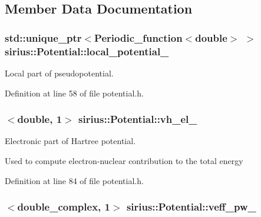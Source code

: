 \subsection{Member Data Documentation}
\hypertarget{classsirius_1_1_potential_a4071c9c5b14fd52005538e4de6e7943d}{}
\subsubsection[{local\+\_\+potential\+\_\+}]{\setlength{\rightskip}{0pt plus 5cm}std\+::unique\+\_\+ptr$<${\bf Periodic\+\_\+function}$<$double$>$ $>$ sirius\+::\+Potential\+::local\+\_\+potential\+\_\+\hspace{0.3cm}{\ttfamily [private]}}\label{classsirius_1_1_potential_a4071c9c5b14fd52005538e4de6e7943d}


Local part of pseudopotential. 



Definition at line 58 of file potential.\+h.

\hypertarget{classsirius_1_1_potential_a0126d2afa48714b359eede273905a64c}{}
\subsubsection[{vh\+\_\+el\+\_\+}]{$<$double, 1$>$ sirius\+::\+Potential\+::vh\+\_\+el\+\_\+\hspace{0.3cm}{\ttfamily [private]}}\label{classsirius_1_1_potential_a0126d2afa48714b359eede273905a64c}


Electronic part of Hartree potential. 

Used to compute electron-\/nuclear contribution to the total energy 

Definition at line 84 of file potential.\+h.

\hypertarget{classsirius_1_1_potential_adf213a65c122ebe4ed46b02560174da8}{}
\subsubsection[{veff\+\_\+pw\+\_\+}]{$<$double\+\_\+complex, 1$>$ sirius\+::\+Potential\+::veff\+\_\+pw\+\_\+\hspace{0.3cm}{\ttfamily [private]}}\label{classsirius_1_1_potential_adf213a65c122ebe4ed46b02560174da8}


